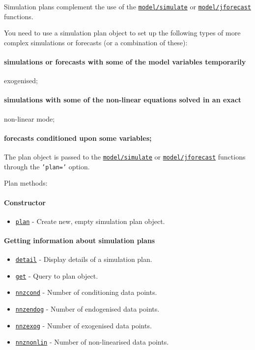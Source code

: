 

	Simulation plans complement the use of the
\href{model/simulate}{\texttt{model/simulate}} or
\href{model/jforecast}{\texttt{model/jforecast}} functions.

You need to use a simulation plan object to set up the following types
of more complex simulations or forecasts (or a combination of these):

\paragraph{simulations or forecasts with some of the model variables
temporarily}

exogenised;

\paragraph{simulations with some of the non-linear equations solved in
an
exact}

non-linear mode;

\paragraph{forecasts conditioned upon some
variables;}

The plan object is passed to the
\href{model/simulate}{\texttt{model/simulate}} or
\href{model/jforecast}{\texttt{model/jforecast}} functions through the
\texttt{'plan='} option.

Plan methods:

\paragraph{Constructor}

\begin{itemize}
\itemsep1pt\parskip0pt
\item
  \href{plan/plan}{\texttt{plan}} - Create new, empty simulation plan
  object.
\end{itemize}

\paragraph{Getting information about simulation
plans}

\begin{itemize}
\itemsep1pt\parskip0pt
\item
  \href{plan/detail}{\texttt{detail}} - Display details of a simulation
  plan.
\item
  \href{plan/get}{\texttt{get}} - Query to plan object.
\item
  \href{plan/nnzcond}{\texttt{nnzcond}} - Number of conditioning data
  points.
\item
  \href{plan/nnzendog}{\texttt{nnzendog}} - Number of endogenised data
  points.
\item
  \href{plan/nnzexog}{\texttt{nnzexog}} - Number of exogenised data
  points.
\item
  \href{plan/nnznonlin}{\texttt{nnznonlin}} - Number of non-linearised
  data points.
\end{itemize}

